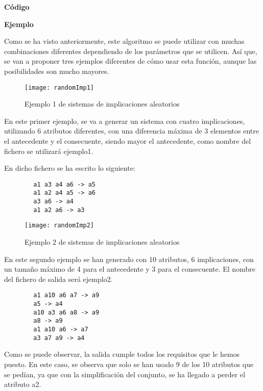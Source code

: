     \bigskip

    \textbf{C\'odigo}

    
    \clearpage


    \textbf{Ejemplo}

    Como se ha visto anteriormente, este algoritmo se puede utilizar con muchas combinaciones diferentes dependiendo de los par\'ametros 
    que se utilicen. As\'i que, se van a proponer tres ejemplos diferentes de c\'omo usar esta funci\'on, aunque las posibilidades 
    son mucho mayores.

    \bigskip

    \begin{figure}[H]
        \centering
        \texttt{[image: randomImp1]}
        \caption{Ejemplo 1 de sistemas de implicaciones aleatorios}
        \label{fig:randomImp1}
    \end{figure}

    En este primer ejemplo, se va a generar un sistema con cuatro implicaciones, utilizando 6 atributos diferentes, con una diferencia m\'axima 
    de 3 elementos entre el antecedente y el consecuente, siendo mayor el antecedente, como nombre del fichero se utilizar\'a ejemplo1.
    
    En dicho fichero se ha escrito lo siguiente:

    \begin{verbatim}
        a1 a3 a4 a6 -> a5 
        a1 a2 a4 a5 -> a6 
        a3 a6 -> a4 
        a1 a2 a6 -> a3    
    \end{verbatim}

    \clearpage

    \begin{figure}[H]
        \centering
        \texttt{[image: randomImp2]}
        \caption{Ejemplo 2 de sistemas de implicaciones aleatorios}
        \label{fig:randomImp2}
    \end{figure}

    En este segundo ejemplo se han generado con 10 atributos, 6 implicaciones, con un tama\~no m\'aximo de 4 para el antecedente y 3 para el 
    consecuente. El nombre del fichero de salida ser\'a ejemplo2.

    \begin{verbatim}
        a1 a10 a6 a7 -> a9 
        a5 -> a4 
        a10 a3 a6 a8 -> a9 
        a8 -> a9 
        a1 a10 a6 -> a7 
        a3 a7 a9 -> a4 
    \end{verbatim}
    Como se puede observar, la salida cumple todos los requisitos que le hemos puesto. En este caso, se observa que solo se han usado 9 de 
    los 10 atributos que se ped\'ian, ya que con la simplificaci\'on del conjunto, se ha llegado a perder el atributo a2.
    \\
    
